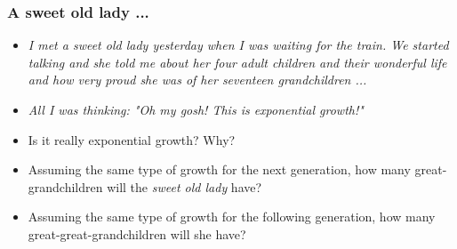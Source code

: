 \documentclass[notheorems
          ]
          {beamer}
\begin{document}
\begin{frame}
 \frametitle { A sweet old lady ... }
 
 
 \begin{itemize}
  \item  \textit{I met a sweet old lady yesterday when I was waiting for the train.
  We started talking and she told me about her four adult children and their wonderful life and
  how very proud she was of her seventeen grandchildren ...} 
  \item \textit{ All I was thinking: "Oh my gosh! This is exponential growth!" }
  \vspace{1em}
  \item Is it really exponential growth? Why?
  \item Assuming the same type of growth for the next generation, how many great-grandchildren
  will the \textit{sweet old lady} have? 
  \item Assuming the same type of growth for the following generation, how many
  great-great-grandchildren will she have? 
        
 \end{itemize}

\end{frame}
\end{document}
